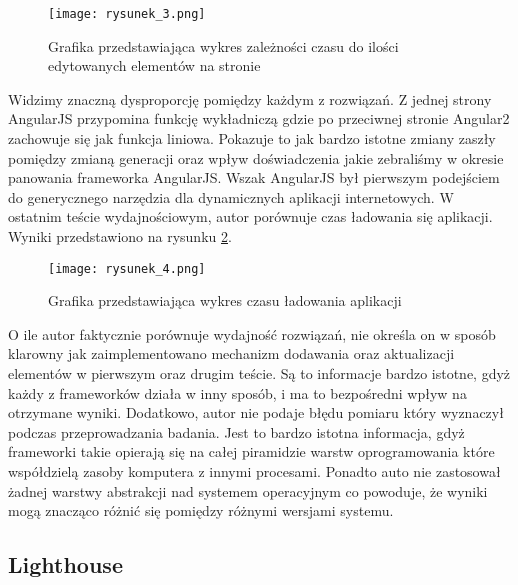 \begin{figure}[!ht]
    \centering
    \texttt{[image: rysunek\_3.png]}
    \caption{Grafika przedstawiająca wykres zależności czasu do ilości edytowanych elementów na stronie \cite{Molin}}
    \label{fig:rysunek_3}
\end{figure}

Widzimy znaczną dysproporcję pomiędzy każdym z rozwiązań. Z jednej strony AngularJS przypomina funkcję wykładniczą gdzie po przeciwnej stronie Angular2 zachowuje się jak funkcja liniowa. Pokazuje to jak bardzo istotne zmiany zaszły pomiędzy zmianą generacji oraz wpływ doświadczenia jakie zebraliśmy w okresie panowania frameworka AngularJS. Wszak AngularJS był pierwszym podejściem do generycznego narzędzia dla dynamicznych aplikacji internetowych.
W ostatnim teście wydajnościowym, autor porównuje czas ładowania się aplikacji. Wyniki przedstawiono na rysunku \ref{fig:rysunek_4}.

\begin{figure}[!ht]
    \centering
    \texttt{[image: rysunek\_4.png]}
    \caption{Grafika przedstawiająca wykres czasu ładowania aplikacji \cite{Molin}}
    \label{fig:rysunek_4}
\end{figure}

O ile autor faktycznie porównuje wydajność rozwiązań, nie określa on w sposób klarowny jak zaimplementowano mechanizm dodawania oraz aktualizacji elementów w pierwszym oraz drugim teście.
Są to informacje bardzo istotne, gdyż każdy z frameworków działa w inny sposób, i ma to bezpośredni wpływ na otrzymane wyniki.
Dodatkowo, autor nie podaje błędu pomiaru \cite{probalistyka} który wyznaczył podczas przeprowadzania badania.
Jest to bardzo istotna informacja, gdyż frameworki takie opierają się na całej piramidzie warstw oprogramowania które współdzielą zasoby komputera z innymi procesami.
Ponadto auto nie zastosował żadnej warstwy abstrakcji nad systemem operacyjnym co powoduje, że wyniki mogą znacząco różnić się pomiędzy różnymi wersjami systemu.

\subsection{Lighthouse}

